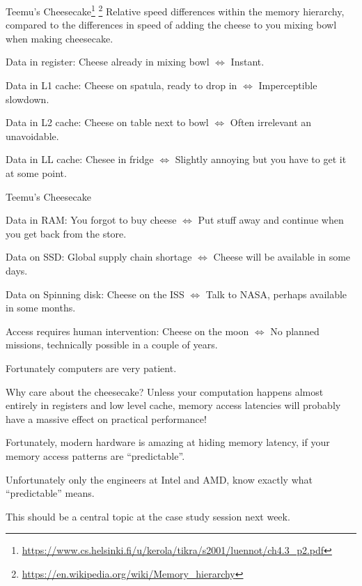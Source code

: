 \documentclass[11pt, aspectratio=169, table]{beamer}
\begin{document}
\begin{frame}{Teemu's Cheesecake\footnote{\url{https://www.cs.helsinki.fi/u/kerola/tikra/s2001/luennot/ch4.3_p2.pdf}}
\footnote{\url{https://en.wikipedia.org/wiki/Memory_hierarchy}}}
Relative speed differences within the memory hierarchy, compared to the differences in speed of adding the cheese to you mixing bowl when making cheesecake.

\begin{description}[style=standard,leftmargin=*]
\item{\alert{Data in register: }} Cheese already in mixing bowl $\Leftrightarrow$ Instant.
\item{\alert{Data in L1 cache: }} Cheese on spatula, ready to drop in $\Leftrightarrow$ Imperceptible slowdown.
\item{\alert{Data in L2 cache: }} Cheese on table next to bowl $\Leftrightarrow$ Often irrelevant an unavoidable.
\item{\alert{Data in LL cache: }} Chesee in fridge $\Leftrightarrow$ Slightly annoying but you have to get it at some point.
\end{description}
\end{frame}

\begin{frame}{Teemu's Cheesecake}
\begin{description}[leftmargin=*]
\item{\alert{Data in RAM: }} You forgot to buy cheese $\Leftrightarrow$ Put stuff away and continue when you get back from the store.
\item{\alert{Data on SSD: }} Global supply chain shortage $\Leftrightarrow$ Cheese will be available in some days.
\item{\alert{Data on Spinning disk: }} Cheese on the ISS $\Leftrightarrow$ Talk to NASA, perhaps available in some months.
\item{\alert{Access requires human intervention: }} Cheese on the moon $\Leftrightarrow$ No planned missions, technically possible in a couple of years.
\end{description}

Fortunately computers are very patient.
\end{frame}

\begin{frame}{Why care about the cheesecake?}
\setlength{\parskip}{\fill}
Unless your computation happens almost entirely in registers and low level cache, memory access latencies 
will probably have a \alert{massive} effect on practical performance!

Fortunately, modern hardware is \alert{amazing} at hiding memory latency, if your memory access patterns
are ``\alert{predictable}''.

Unfortunately only the engineers at Intel and AMD, know exactly what ``predictable'' means.

This should be a central topic at the case study session next week.
\end{frame}
\end{document}

